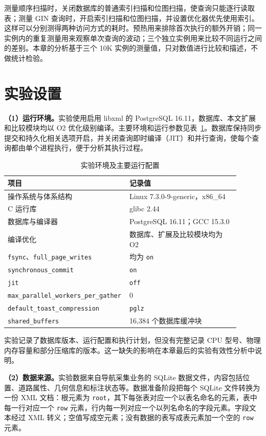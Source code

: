 测量顺序扫描时，关闭数据库的普通索引扫描和位图扫描，使查询只能逐行读取表；测量 GIN 查询时，开启索引扫描和位图扫描，并设置优化器优先使用索引。这样可以分别测得两种访问方式的耗时。预热用来排除首次执行的额外开销；同一实例内的重复测量用来观察单次查询的波动；三个独立实例用来比较不同运行之间的差别。本章的分析基于三个 10K 实例的测量值，只对数值进行比较和描述，不做统计检验。

\section{实验设置}
\textbf{（1）运行环境。}实验使用启用 libxml 的 PostgreSQL 16.11，数据库、本文扩展和比较模块均以 O2 优化级别编译。主要环境和运行参数见表~\ref{tab:exp-environment}。数据库保持同步提交和持久化相关选项开启，并关闭查询即时编译（JIT）和并行查询，使每个查询都由单个进程执行，便于分析其执行过程。
\begin{table}[htbp]
\centering\small
\caption{实验环境及主要运行配置}
\label{tab:exp-environment}
\begin{tabular}{p{0.43\linewidth}p{0.47\linewidth}}
\toprule
项目 & 记录值 \\
\midrule
操作系统与体系结构 & Linux 7.3.0-9-generic，x86\_64 \\
C 运行库 & glibc 2.44 \\
数据库与编译器 & PostgreSQL 16.11；GCC 15.3.0 \\
编译优化 & 数据库、扩展及比较模块均为 O2 \\
\texttt{fsync}、\texttt{full\_page\_writes} & 均为 \texttt{on} \\
\texttt{synchronous\_commit} & \texttt{on} \\
\texttt{jit} & \texttt{off} \\
\texttt{max\_parallel\_workers\_per\_gather} & 0 \\
\texttt{default\_toast\_compression} & \texttt{pglz} \\
\texttt{shared\_buffers} & 16,384 个数据库缓冲块 \\
\bottomrule
\end{tabular}
\end{table}

实验记录了数据库版本、运行配置和执行计划，但没有完整记录 CPU 型号、物理内存容量和部分压缩库的版本。这一缺失的影响在本章最后的实验有效性分析中说明。

\textbf{（2）数据来源。}实验数据来自导航采集业务的 SQLite 数据文件，内容包括位置、道路属性、几何信息和标注状态等。数据准备阶段把每个 SQLite 文件转换为一份 XML 文档：根元素为 \texttt{root}，其下每张表对应一个以表名命名的元素，表中每一行对应一个 \texttt{row} 元素，行内每一列对应一个以列名命名的字段元素。字段文本经过 XML 转义；空值写成空元素；没有数据的表写成表元素加一个空的 \texttt{row} 元素。


